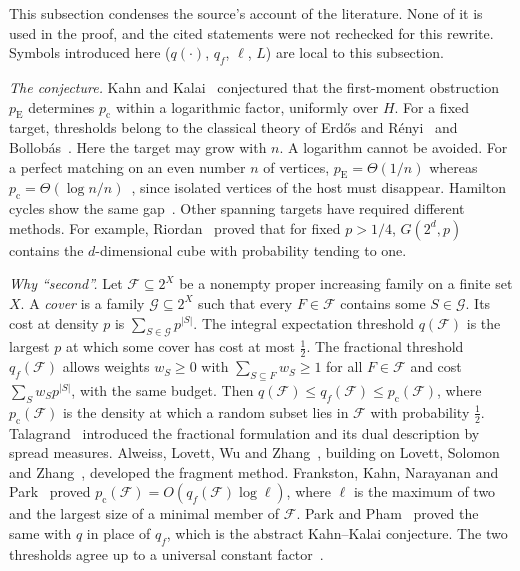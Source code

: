 \documentclass[11pt]{article}
\numberwithin{equation}{section}
\newcommand{\pc}{p_{\mathrm c}}
\newcommand{\pE}{p_{\mathrm E}}
\begin{document}
This subsection condenses the source's account of the literature. None
of it is used in the proof, and the cited statements were not rechecked
for this rewrite. Symbols introduced here ($q(\cdot)$, $q_f$, $\ell$,
$L$) are local to this subsection.

\emph{The conjecture.} Kahn and Kalai~\cite{KK07} conjectured that the
first-moment obstruction $\pE$ determines $\pc$ within a logarithmic
factor, uniformly over $H$. For a fixed target, thresholds belong to the
classical theory of Erd\H{o}s and R\'enyi~\cite{ER60} and
Bollob\'as~\cite{Bollobas81}. Here the target may grow with $n$. A
logarithm cannot be avoided. For a perfect matching on an even number
$n$ of vertices, $\pE=\Theta(1/n)$ whereas
$\pc=\Theta(\log n/n)$~\cite{ER66,KK07}, since isolated vertices of the
host must disappear. Hamilton cycles show the same gap~\cite{KK07}.
Other spanning targets have required different methods. For example,
Riordan~\cite{Riordan00} proved that for fixed $p>1/4$, $G(2^d,p)$
contains the $d$-dimensional cube with probability tending to one.

\emph{Why ``second''.} Let $\mathcal F\subseteq2^X$ be a nonempty
proper increasing family on a finite set $X$. A \emph{cover} is a
family $\mathcal G\subseteq 2^X$ such that every $F\in\mathcal F$
contains some $S\in\mathcal G$. Its cost at density $p$ is
$\sum_{S\in\mathcal G}p^{|S|}$. The integral expectation threshold
$q(\mathcal F)$ is the largest $p$ at which some cover has cost at most
$\frac12$. The fractional threshold $q_f(\mathcal F)$ allows weights
$w_S\ge0$ with $\sum_{S\subseteq F}w_S\ge1$ for all $F\in\mathcal F$
and cost $\sum_Sw_Sp^{|S|}$, with the same budget. Then
$q(\mathcal F)\le q_f(\mathcal F)\le \pc(\mathcal F)$, where
$\pc(\mathcal F)$ is the density at which a random subset lies in
$\mathcal F$ with probability $\frac12$.
Talagrand~\cite[Section~6]{Tal10} introduced the fractional formulation
and its dual description by spread measures. Alweiss, Lovett, Wu and
Zhang~\cite{ALWZ21}, building on Lovett, Solomon and
Zhang~\cite{LSZ19}, developed the fragment method. Frankston, Kahn,
Narayanan and Park~\cite{FKNP21} proved
$\pc(\mathcal F)=O(q_f(\mathcal F)\log\ell)$, where $\ell$ is the
maximum of two and the largest size of a minimal member of
$\mathcal F$. Park and Pham~\cite{PP24} proved the same with $q$ in
place of $q_f$, which is the abstract Kahn--Kalai conjecture. The two
thresholds agree up to a universal constant
factor~\cite[Theorem~1.1]{OpenAIThresholdEquivalence2026}.
\end{document}
